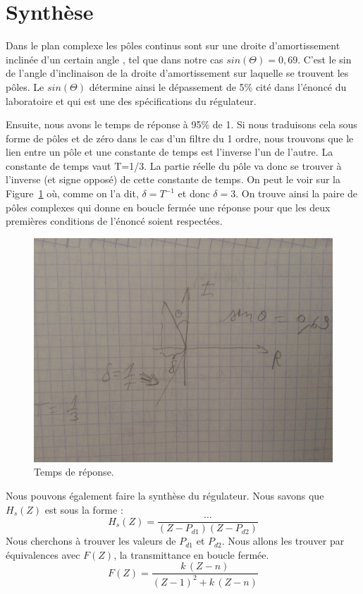 \section{Synthèse}

Dans le plan complexe les pôles continus sont sur une droite d'amortissement inclinée d'un certain angle \Theta{}, tel que dans notre cas $sin(\Theta) = 0,69$.
C'est le sin de l'angle d'inclinaison de la droite d'amortissement sur laquelle se trouvent les pôles.
Le $sin(\Theta)$ détermine ainsi le dépassement de 5\% cité dans l'énoncé du laboratoire et qui est une des spécifications du régulateur.

Ensuite, nous avons le temps de réponse à 95\% de 1.
Si nous traduisons cela sous forme de pôles et de zéro dans le cas d'un filtre du 1 ordre, nous trouvons que le lien entre un pôle et une constante de temps est l'inverse l'un de l'autre.
La constante de temps vaut T=1/3.
La partie réelle du pôle va donc se trouver à l'inverse (et signe opposé) de cette constante de temps.
On peut le voir sur la Figure~\ref{fig:temps-de-reponse} où, comme on l'a dit, $\delta = T^{-1}$ et donc $\delta = 3$.
On trouve ainsi la paire de pôles complexes  qui donne en boucle fermée une réponse pour que les deux premières conditions de l'énoncé soient respectées.

\begin{figure}[!ht]
	\centering
	\includegraphics[scale=0.1]{images/IMG_1681.jpg}
	\caption{Temps de réponse.}
	\label{fig:temps-de-reponse}
\end{figure}

Nous pouvons également faire la synthèse du régulateur.
Nous savons que $H_s(Z)$ est sous la forme :
\begin{equation}
	H_s(Z) = \frac{\dots}{(Z-P_{d1})(Z-P_{d2})}
\end{equation}
Nous cherchons à trouver les valeurs de $P_{d1}$ et $P_{d2}$.
Nous allons les trouver par équivalences avec $F(Z)$, la transmittance en boucle fermée.
\begin{equation}
	F(Z) = \frac{k\,(Z-n)}{(Z-1)^2+k\,(Z-n)}
\end{equation}

